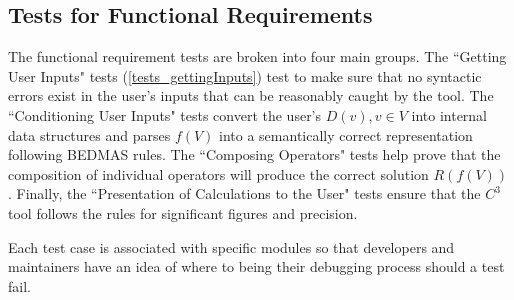 \documentclass[12pt, titlepage]{article}
\newcommand{\prognameAbbrv}{$C^{3}$}
\begin{document}
%
%
	
\subsection{Tests for Functional Requirements}
\label{testplan_functional}
The functional requirement tests are broken into four main groups. The 
``Getting User Inputs" tests (\ref{tests_gettingInputs}) test to make sure that 
no syntactic errors exist in the user's inputs that can be reasonably caught by 
the tool. The ``Conditioning User Inputs" tests convert the user's $D(v), v \in 
V$ into internal data structures and parses $f(V)$ into a semantically correct 
representation following BEDMAS rules. The ``Composing Operators" tests help 
prove that the composition of individual operators will produce the correct 
solution $R(f(V))$. Finally, the ``Presentation of Calculations to the User" 
tests ensure that the \prognameAbbrv{} tool follows the rules for significant 
figures and precision.

Each test case is associated with specific modules so that developers and 
maintainers have an idea of where to being their debugging process should a 
test fail.
\end{document}
